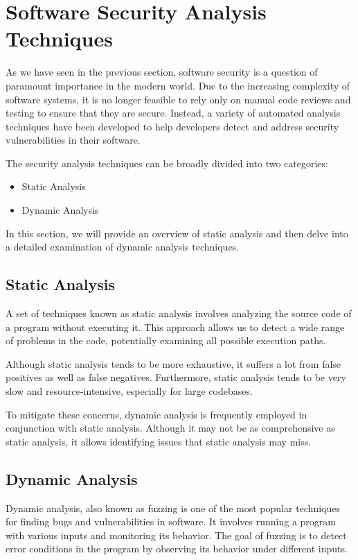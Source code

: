 \section{Software Security Analysis Techniques}

As we have seen in the previous section, software security is a question of paramount importance in the modern world. Due to the increasing complexity of software systems, it is no longer feasible to rely only on manual code reviews and testing to ensure that they are secure. Instead, a variety of automated analysis techniques have been developed to help developers detect and address security vulnerabilities in their software.

The security analysis techniques can be broadly divided into two categories:

\begin{itemize}
	\item Static Analysis
	\item Dynamic Analysis
\end{itemize}

In this section, we will provide an overview of static analysis and then delve into a detailed examination of dynamic analysis techniques.

\subsection{Static Analysis}

A set of techniques known as static analysis involves analyzing the source code of a program without executing it. This approach allows us to detect a wide range of problems in the code, potentially examining all possible execution paths.

Although static analysis tends to be more exhaustive, it suffers a lot from false positives as well as false negatives. Furthermore, static analysis tends to be very slow and resource-intensive, especially for large codebases.

To mitigate these concerns, dynamic analysis is frequently employed in conjunction with static analysis. Although it may not be as comprehensive as static analysis, it allows identifying issues that static analysis may miss.

\subsection{Dynamic Analysis}

Dynamic analysis, also known as fuzzing is one of the most popular techniques for finding bugs and vulnerabilities in software. It involves running a program with various inputs and monitoring its behavior. The goal of fuzzing is to detect error conditions in the program by observing its behavior under different inputs.

